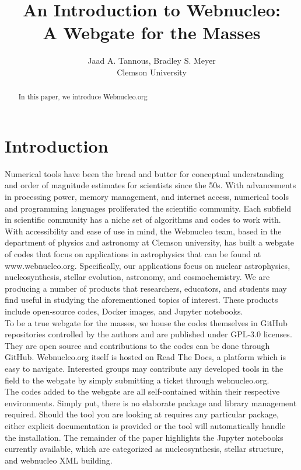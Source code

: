 \documentclass{article}
\title{An Introduction to Webnucleo:\\
        A Webgate for the Masses}
\author{Jaad A. Tannous, Bradley S. Meyer\\
        Clemson University}
\date{}
\begin{document}
\maketitle
\begin{abstract}
In this paper, we introduce Webnucleo.org
\end{abstract}

\section*{Introduction}
Numerical tools have been the bread and butter for conceptual understanding and order of magnitude 
estimates for scientists since the 50s. With advancements in processing power, memory management, and 
internet access, numerical tools and programming languages proliferated the scientific community. Each 
subfield in scientific community has a niche set of algorithms and codes to work with. With accessibility
and ease of use in mind, the Webnucleo team, based in the department of physics and astronomy at Clemson university, has built 
a webgate of codes that focus on applications in astrophysics that can be found at www.webnucleo.org. Specifically, our applications
focus on nuclear astrophysics, nucleosynthesis, stellar evolution, astronomy, and cosmochemistry. We are producing a number
of products that researchers, educators, and students may find useful in studying the aforementioned topics of interest. 
These products include open-source codes, Docker images, and Jupyter notebooks.\\

To be a true webgate for the masses, we house the codes themselves in GitHub repositories controlled 
by the authors and are published under GPL-3.0 licenses. They are open source and contributions to the codes can be 
done through GitHub. Webnucleo.org itself is hosted on Read The Docs, a platform which is easy to navigate. Interested 
groups may contribute any developed tools in the field to the webgate by simply submitting  a ticket through webnucleo.org.\\

The codes added to the webgate are all self-contained within their respective environments. Simply put, there is no 
elaborate package and library management required. Should the tool you are looking at requires any particular package, either 
explicit documentation is provided or the tool will automatically handle the installation. The remainder 
of the paper highlights the Jupyter notebooks currently available, which are categorized as nucleosynthesis, stellar structure, 
and webnucleo XML building.
\end{document}
